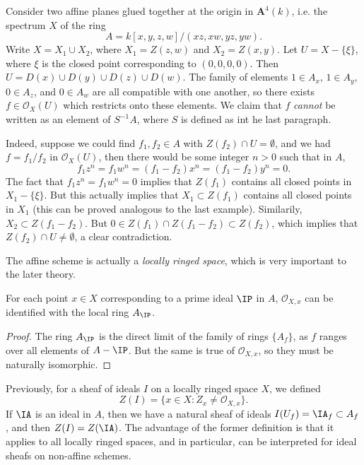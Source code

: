 \begin{example}
    Consider two affine planes glued together at the origin in $\mathbf{A}^4(k)$, i.e. the spectrum $X$ of the ring
    \[ A = k[x,y,z,w]/(xz,xw,yz,yw). \]
    Write $X = X_1 \cup X_2$, where $X_1 = Z(z,w)$ and $X_2 = Z(x,y)$. Let $U = X - \{ \xi \}$, where $\xi$ is the closed point corresponding to $(0,0,0,0)$. Then $U = D(x) \cup D(y) \cup D(z) \cup D(w)$. The family of elements $1 \in A_x$, $1 \in A_y$, $0 \in A_z$, and $0 \in A_w$ are all compatible with one another, so there exists $f \in \mathcal{O}_X(U)$ which restricts onto these elements. We claim that $f$ \emph{cannot} be written as an element of $S^{-1}A$, where $S$ is defined as int he last paragraph.

    Indeed, suppose we could find $f_1,f_2 \in A$ with $Z(f_2) \cap U = \emptyset$, and we had $f = f_1/f_2$ in $\mathcal{O}_X(U)$, then there would be some integer $n > 0$ such that in $A$,
    \[ f_1z^n = f_1w^n = (f_1 - f_2)x^n = (f_1 - f_2)y^n = 0. \]
    The fact that $f_1z^n = f_1w^n = 0$ implies that $Z(f_1)$ contains all closed points in $X_1 - \{ \xi \}$. But this actually implies that $X_1 \subset Z(f_1)$ contains all closed points in $X_1$ (this can be proved analogous to the last example). Similarily, $X_2 \subset Z(f_1 - f_2)$. But $0 \in Z(f_1) \cap Z(f_1 - f_2) \subset Z(f_2)$, which implies that $Z(f_2) \cap U \neq \emptyset$, a clear contradiction.
\end{example}

The affine scheme is actually a \emph{locally ringed space}, which is very important to the later theory.

\begin{theorem}
    For each point $x \in X$ corresponding to a prime ideal $\IP$ in $A$, $\mathcal{O}_{X,x}$ can be identified with the local ring $A_{\IP}$.
\end{theorem}
\begin{proof}
    The ring $A_{\IP}$ is the direct limit of the family of rings $\{ A_f \}$, as $f$ ranges over all elements of $A - \IP$. But the same is true of $\mathcal{O}_{X,x}$, so they must be naturally isomorphic.
\end{proof}

\begin{remark}
    Previously, for a sheaf of ideals $I$ on a locally ringed space $X$, we defined
    \[ Z(I) = \{ x \in X: Z_x \neq \mathcal{O}_{X,x} \}. \]
    If $\IA$ is an ideal in $A$, then we have a natural sheaf of ideals $I(U_f) = \IA_f \subset A_f$, and then $Z(I) = Z(\IA)$. The advantage of the former definition is that it applies to all locally ringed spaces, and in particular, can be interpreted for ideal sheafs on non-affine schemes.
\end{remark}

